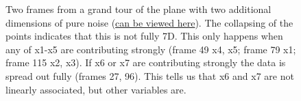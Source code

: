 \documentclass[
  letterpaper,
]{krantz}
\begin{document}
\begin{figure}

\begin{minipage}[t]{0.50\linewidth}

{\centering 


}

\end{minipage}%
%
\begin{minipage}[t]{0.50\linewidth}

{\centering 


}

\end{minipage}%

\caption{\label{fig-plane-noise-pdf}Two frames from a grand tour of the
plane with two additional dimensions of pure noise
(\href{https://dicook.github.io/mulgar_book/3-intro-dimred.html}{can be
viewed here}). The collapsing of the points indicates that this is not
fully 7D. This only happens when any of x1-x5 are contributing strongly
(frame 49 x4, x5; frame 79 x1; frame 115 x2, x3). If x6 or x7 are
contributing strongly the data is spread out fully (frames 27, 96). This
tells us that x6 and x7 are not linearly associated, but other variables
are.}

\end{figure}
\end{document}
